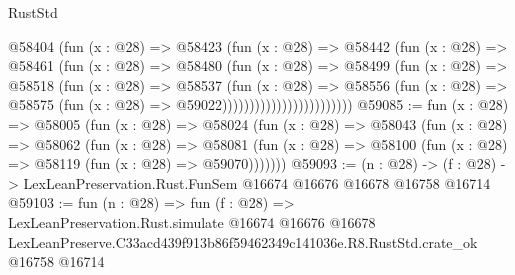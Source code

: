 \begin{lexlean}{RustStd}
\begin{coremodule}
                              @58404
                                (fun (x : @28) =>
                                @58423
                                  (fun (x : @28) =>
                                  @58442
                                    (fun (x : @28) =>
                                    @58461
                                      (fun (x : @28) =>
                                      @58480
                                        (fun (x : @28) =>
                                        @58499
                                          (fun (x : @28) =>
                                          @58518
                                            (fun (x : @28) =>
                                            @58537
                                              (fun (x : @28) =>
                                              @58556
                                                (fun (x : @28) =>
                                                @58575
                                                  (fun (x : @28) => @59022))))))))))))))))))))))))
@59085 := fun (x : @28) =>
  @58005
    (fun (x : @28) =>
    @58024
      (fun (x : @28) =>
      @58043
        (fun (x : @28) =>
        @58062
          (fun (x : @28) =>
          @58081 (fun (x : @28) => @58100 (fun (x : @28) => @58119 (fun (x : @28) => @59070)))))))
@59093 := (n : @28) ->
  (f : @28) -> LexLeanPreservation.Rust.FunSem @16674 @16676 @16678 @16758 @16714
@59103 := fun (n : @28) =>
  fun (f : @28) =>
  LexLeanPreservation.Rust.simulate
    @16674
    @16676
    @16678
    LexLeanPreserve.C33acd439f913b86f59462349c141036e.R8.RustStd.crate_ok
    @16758
    @16714
\end{coremodule}
\end{lexlean}
